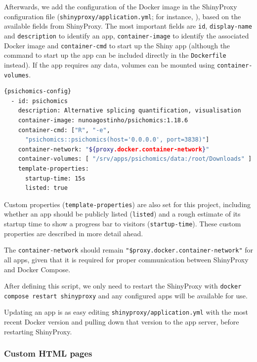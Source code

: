 Afterwards, we add the configuration of the Docker image in the ShinyProxy configuration file (\texttt{shinyproxy/application.yml}; for instance, ), based on the available fields from ShinyProxy. The most important fields are \texttt{id}, \texttt{display-name} and \texttt{description} to identify an app, \texttt{container-image} to identify the associated Docker image and \texttt{container-cmd} to start up the Shiny app (although the command to start up the app can be included directly in the \texttt{Dockerfile} instead). If the app requires any data, volumes can be mounted using \texttt{container-volumes}.

\begin{lstlisting}[caption=\texttt{psichomics} configuration in the app server.,language=bash,label={lst:psichomics-config}]{psichomics-config}
  - id: psichomics
    description: Alternative splicing quantification, visualisation                 and analysis
    container-image: nunoagostinho/psichomics:1.18.6
    container-cmd: ["R", "-e",
      "psichomics::psichomics(host='0.0.0.0', port=3838)"]
    container-network: "${proxy.docker.container-network}"
    container-volumes: [ "/srv/apps/psichomics/data:/root/Downloads" ]
    template-properties:
      startup-time: 15s
      listed: true
\end{lstlisting}

Custom properties (\texttt{template-properties}) are also set for this project, including whether an app should be publicly listed (\texttt{listed}) and a rough estimate of its startup time to show a progress bar to visitors (\texttt{startup-time}). These custom properties are described in more detail ahead.

The \texttt{container-network} should remain \texttt{"\${proxy.docker.container-network}"} for all apps, given that it is required for proper communication between ShinyProxy and Docker Compose.

After defining this script, we only need to restart the ShinyProxy with \texttt{docker compose restart shinyproxy} and any configured apps will be available for use.

Updating an app is as easy editing \texttt{shinyproxy/application.yml} with the most recent Docker version and pulling down that version to the app server, before restarting ShinyProxy.

\subsubsection{Custom HTML pages}

